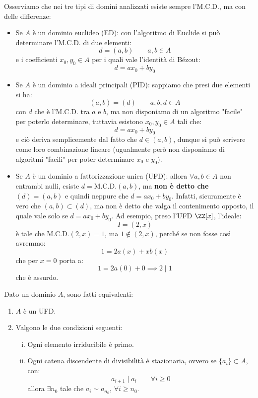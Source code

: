 \documentclass[11pt]{scrartcl}
\begin{document}
\begin{remark}
    Osserviamo che nei tre tipi di domini analizzati esiste sempre l'M.C.D., ma con delle differenze:
    \begin{itemize}
        \item Se $A$ è un dominio euclideo (ED): con l'algoritmo di Euclide si può determinare l'M.C.D. di due elementi:
        \[ d = (a,b) \qquad a,b \in A
            \]
        e i coefficienti $x_0,y_0 \in A$ per i quali vale l'identità di Bézout:
        \[ d = ax_0 + by_0
            \]
        \item Se $A$ è un dominio a ideali principali (PID): sappiamo che presi due elementi si ha:
        \[ (a,b) = (d) \qquad a,b,d \in A
            \]
        con $d$ che è l'M.C.D. tra $a$ e $b$, ma non disponiamo di un algoritmo "facile" per poterlo determinare, tuttavia esistono $x_0, y_0 \in A$ tali che:
        \[ d = ax_0 + by_0
            \]
        e ciò deriva semplicemente dal fatto che $d \in (a,b)$, dunque si può scrivere come loro combinazione lineare (ugualmente però non disponiamo di algoritmi "facili" per poter determinare $x_0$ e $y_0$).
        \item Se $A$ è un dominio a fattorizzazione unica (UFD): allora $\forall a,b \in A$ non entrambi nulli, esiste $d = \text{M.C.D.}(a,b)$, ma \textbf{non è detto che} $(d) = (a,b)$ e quindi neppure che $d = ax_0 + by_0$.
        Infatti, sicuramente è vero che $(a,b) \subset (d)$, ma non è detto che valga il contenimento opposto, il quale vale solo se $d = ax_0 + by_0$. Ad esempio, preso l'UFD $\ZZ[x]$, l'ideale:
        \[ I = (2,x)
            \]
        è tale che $\text{M.C.D.}(2,x) = 1$, ma $1 \not \in (2,x)$, perché se non fosse così avremmo:
        \[ 1 = 2a(x) + xb(x)
            \]
        che per $x = 0$ porta a:
        \[ 1 = 2a(0) + 0 \implies 2 \mid 1
            \]
        che è assurdo.
    \end{itemize}
\end{remark}

\begin{theorem}
    \label{2.101}
    Dato un dominio $A$, sono fatti equivalenti:
    \begin{enumerate}[(1)]
        \item $A$ è un UFD.
        \item Valgono le due condizioni seguenti:
        \begin{enumerate}[(i)]
            \item Ogni elemento irriducibile è primo.
            \item Ogni catena discendente di divisibilità è stazionaria, ovvero se $\{a_i\} \subset A$, con:
            \[ a_{i+1} \mid a_i \qquad \forall i \geq 0
                \]
            allora $\exists n_0$ tale che $a_i \sim a_{n_0}$, $\forall i \geq n_0$.
        \end{enumerate}
    \end{enumerate}
\end{theorem}
\end{document}
